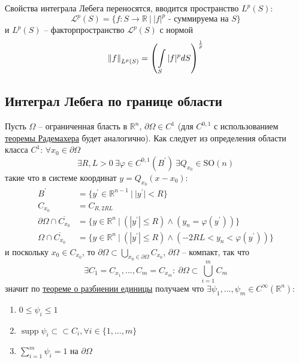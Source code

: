\documentclass[12pt,a4paper]{article}
\newcommand{\intset}[1]{\int\limits_{#1}}
\newcommand{\Real}{\mathbb{R}}
\newcommand{\ssubset}{\subset \subset}
\DeclareMathOperator\supp{supp}
\begin{document}
Свойства интеграла Лебега переносятся, вводится пространство $L^p (S)$:
\begin{equation*}
\mathcal{L}^p (S) = \{ f : S \to \Real \ | \ |f|^p \text{ - суммируема на } S \}
\end{equation*}
и $L^p (S)$ -- факторпространство $\mathcal{L}^p (S)$ с нормой
\begin{equation*}
\norm{f}_{L^p (S)} = \left(\intset{S}{|f|^p dS}\right)^{\frac{1}{p}}
\end{equation*}

\subsection{Интеграл Лебега по границе области}

Пусть $\Omega$ -- ограниченная бласть в $\Real^n$, $\partial \Omega \in C^1$ (для $C^{0,1}$ с использованием \hyperref[mth:2]{теоремы Радемахера} будет аналогично). Как следует из определения области класса $C^1$: $\forall x_0 \in \partial \Omega$
\begin{equation*}
	\exists R, L > 0 \ \exists \varphi \in C^{0, 1} (B^\prime) \ \exists Q_{x_0} \in \text{SO}(n)
\end{equation*}
такие что в системе координат $y = Q_{x_0} (x - x_0)$:
\begin{align*}
	B^\prime &= \{ y^\prime \in \Real^{n-1} \ | \ |y^\prime| < R \} \\
	C_{x_0} &= C_{R, 2RL} \\
	\partial \Omega \cap \overline{C_{x_0}} &= \{ y \in \Real^n \ | \ (|y^\prime| \leq R) \wedge (y_n = \varphi(y^\prime)) \} \\
	\Omega \cap \overline{C_{x_0}} &= \{ y \in \Real^n \ | \ (|y^\prime| \leq R) \wedge (-2RL < y_n < \varphi(y^\prime)) \}
\end{align*}
и поскольку $x_0 \in C_{x_0}$, то $\partial \Omega \subset \bigcup\limits_{x_0 \in \partial \Omega}{C_{x_0}}$, $\partial \Omega$ -- компакт, так что
\begin{equation*}
	\exists C_1 = C_{x_1}, ..., C_m = C_{x_m}: \ \partial \Omega \subset \bigcup\limits_{i=1}^{m}{C_m}
\end{equation*}
значит по \hyperref[mth:3]{теореме о разбиении единицы} получаем что $\exists \psi_1, ..., \psi_m \in C^\infty (\Real^n)$:
\begin{enumerate}
	\item $0 \leq \psi_i \leq 1$
	\item $\supp \psi_i \ssubset C_i, \forall i \in \{1, ..., m\}$
	\item $\sum\limits_{i=1}^{m}{\psi_i} = 1$ на $\partial \Omega$
\end{enumerate}
\end{document}
